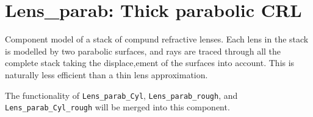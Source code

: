 \section{Lens\_parab: Thick parabolic CRL}

Component model of a stack of compund refractive lenses. Each lens in the stack is modelled by two parabolic surfaces, and rays are traced through all the complete stack  taking the displace,ement of the surfaces into account. This is naturally less efficient than a thin lens approximation.

The functionality of \texttt{Lens\_parab_Cyl}, \texttt{Lens\_parab_rough}, and \texttt{Lens\_parab_Cyl_rough} will be merged into this component.
